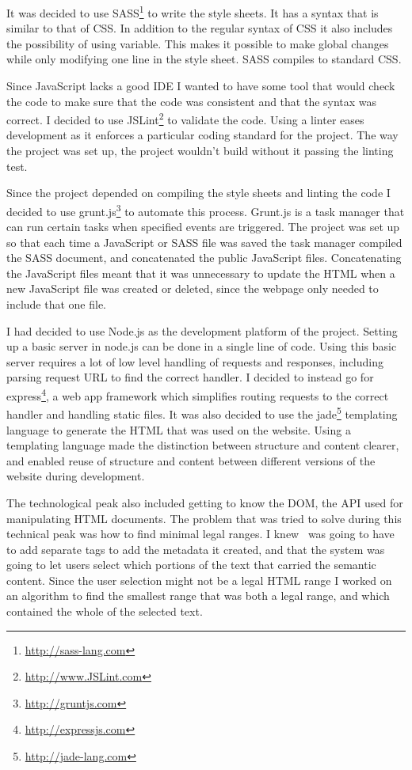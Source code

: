 It was decided to use SASS\footnote{\url{http://sass-lang.com}} to write the style sheets.
It has a syntax that is similar to that of CSS.
In addition to the regular syntax of CSS it also includes the possibility of using variable.
This makes it possible to make global changes while only modifying one line in the style sheet.
SASS compiles to standard CSS.

Since JavaScript lacks a good IDE I wanted to have some tool that would check the code to make sure that the
code was consistent and that the syntax was correct.
I decided to use JSLint\footnote{\url{http://www.JSLint.com}} to validate the code.
Using a linter eases development as it enforces a particular coding standard for the project.
The way the project was set up, the project wouldn't build without it passing the linting test.

Since the project depended on compiling the style sheets and linting the code I decided to use grunt.js\footnote{\url{http://gruntjs.com}}
to automate this process.
Grunt.js is a task manager that can run certain tasks when specified events are triggered.
The project was set up so that each time a JavaScript or SASS file was saved the task manager compiled the SASS document,
and concatenated the public JavaScript files.
Concatenating the JavaScript files meant that it was unnecessary to update the HTML when a new JavaScript file was created or deleted,
since the webpage only needed to include that one file.

I had decided to use Node.js as the development platform of the project.
Setting up a basic server in node.js can be done in a single line of code.
Using this basic server requires a lot of low level handling of requests and responses,
including parsing request URL to find the correct handler.
I decided to instead go for express\footnote{\url{http://expressjs.com}},
a web app framework which simplifies routing requests to the correct handler and handling static files.
It was also decided to use the jade\footnote{\url{http://jade-lang.com}}
templating language to generate the HTML that was used on the website.
Using a templating language made the distinction between structure and content clearer,
and enabled reuse of structure and content between different versions of the website during development.

The technological peak also included getting to know the DOM, the API used for manipulating HTML documents.
The problem that was tried to solve during this technical peak was how to find minimal legal ranges.
I knew \theartefact\ was going to have to add separate tags to add the metadata it created,
and that the system was going to let users select which portions of the text that carried the semantic content.
Since the user selection might not be a legal HTML range I worked on an algorithm to find the smallest range that
was both a legal range, and which contained the whole of the selected text.


